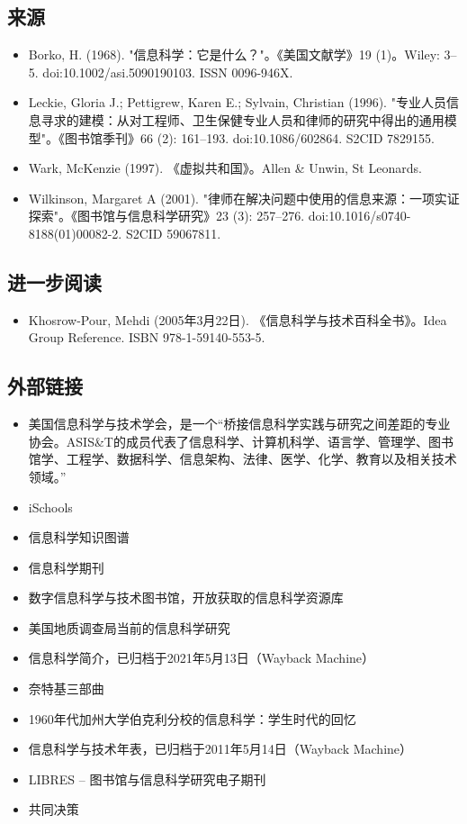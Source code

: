 \subsection{来源} 
\begin{itemize}
\item Borko, H. (1968). "信息科学：它是什么？"。《美国文献学》19 (1)。Wiley: 3–5. doi:10.1002/asi.5090190103. ISSN 0096-946X.  
\item Leckie, Gloria J.; Pettigrew, Karen E.; Sylvain, Christian (1996). "专业人员信息寻求的建模：从对工程师、卫生保健专业人员和律师的研究中得出的通用模型"。《图书馆季刊》66 (2): 161–193. doi:10.1086/602864. S2CID 7829155.  
\item Wark, McKenzie (1997). 《虚拟共和国》。Allen & Unwin, St Leonards.  
\item Wilkinson, Margaret A (2001). "律师在解决问题中使用的信息来源：一项实证探索"。《图书馆与信息科学研究》23 (3): 257–276. doi:10.1016/s0740-8188(01)00082-2. S2CID 59067811.  
\end{itemize}
\subsection{进一步阅读 } 
\begin{itemize}
\item Khosrow-Pour, Mehdi (2005年3月22日). 《信息科学与技术百科全书》。Idea Group Reference. ISBN 978-1-59140-553-5.
\end{itemize}
\subsection{外部链接}
\begin{itemize}
\item 美国信息科学与技术学会，是一个“桥接信息科学实践与研究之间差距的专业协会。ASIS&T的成员代表了信息科学、计算机科学、语言学、管理学、图书馆学、工程学、数据科学、信息架构、法律、医学、化学、教育以及相关技术领域。”
\item iSchools  
\item 信息科学知识图谱  
\item 信息科学期刊  
\item 数字信息科学与技术图书馆，开放获取的信息科学资源库  
\item 美国地质调查局当前的信息科学研究  
\item 信息科学简介，已归档于2021年5月13日（Wayback Machine）  
\item 奈特基三部曲  
\item 1960年代加州大学伯克利分校的信息科学：学生时代的回忆  
\item 信息科学与技术年表，已归档于2011年5月14日（Wayback Machine）  
\item LIBRES – 图书馆与信息科学研究电子期刊 
\item 共同决策
\end{itemize}